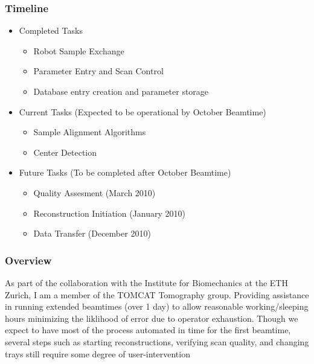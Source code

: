 \subsubsection*{Timeline}
\begin{itemize}
 	\item Completed Tasks
	\begin{itemize}
		\item Robot Sample Exchange 
		\item Parameter Entry and Scan Control
		\item Database entry creation and parameter storage
	\end{itemize}
	\item Current Tasks (Expected to be operational by October Beamtime)
	\begin{itemize}
		\item Sample Alignment Algorithms
		\item Center Detection
	\end{itemize}
	\item Future Tasks (To be completed after October Beamtime)
	\begin{itemize}
		\item Quality Assesment (March 2010)
		\item Reconstruction Initiation (January 2010)
		\item Data Transfer (December 2010)
	\end{itemize}
\end{itemize}
\subsubsection*{Overview}
As part of the collaboration with the Institute for Biomechanics at the ETH Zurich, I am a member of the TOMCAT Tomography group. Providing assistance in running extended beamtimes (over 1 day) to allow reasonable working/sleeping hours minimizing the liklihood of error due to operator exhaustion. Though we expect to have most of the process automated in time for the first beamtime, several steps such as starting reconstructions, verifying scan quality, and changing trays still require some degree of user-intervention


